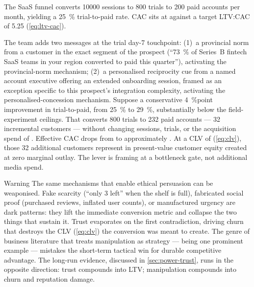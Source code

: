 \begin{example}
The SaaS funnel converts \num{10000} sessions to \num{800} trials to \num{200} paid
accounts per month, yielding a \qty{25}{\percent} trial-to-paid rate. CAC sits at
 against a target LTV:CAC of \num{5.25}\texttimes{} (\cref{eq:ltv-cac}).

The team adds two messages at the trial day-7 touchpoint: (1)~a provincial norm from
a customer in the exact segment of the prospect (``\qty{73}{\percent} of Series~B
fintech SaaS teams in your region converted to paid this quarter''), activating the
\textcite{goldstein2008field} provincial-norm mechanism; (2)~a personalised reciprocity
cue from a named account executive offering an extended onboarding session, framed as
an exception specific to this prospect's integration complexity, activating the
\textcite{strohmetz2002field} personalised-concession mechanism. Suppose a conservative
\qty{4}{\percent}point improvement in trial-to-paid, from \qty{25}{\percent} to
\qty{29}{\percent}, substantially below the field-experiment ceilings. That converts
\num{800} trials to \num{232} paid accounts --- \num{32} incremental customers --- without
changing sessions, trials, or the acquisition spend of . Effective CAC drops
from  to approximately . At a CLV of  (\cref{eq:clv}),
those \num{32} additional customers represent  in present-value customer
equity created at zero marginal outlay. The lever is framing at a bottleneck gate, not
additional media spend.
\end{example}

\begin{admonition}{Warning}
The same mechanisms that enable ethical persuasion can be weaponised. Fake scarcity
(``only 3 left'' when the shelf is full), fabricated social proof (purchased reviews,
inflated user counts), or manufactured urgency are dark patterns: they lift the immediate
conversion metric and collapse the two things that sustain it. Trust evaporates on the
first contradiction, driving churn that destroys the CLV (\cref{eq:clv}) the conversion
was meant to create. The genre of business literature that treats manipulation as strategy
--- \textcite{greene1998laws} being one prominent example --- mistakes the short-term
tactical win for durable competitive advantage. The long-run evidence, discussed in
\cref{sec:power-trust}, runs in the opposite direction: trust compounds into LTV;
manipulation compounds into churn and reputation damage.
\end{admonition}



